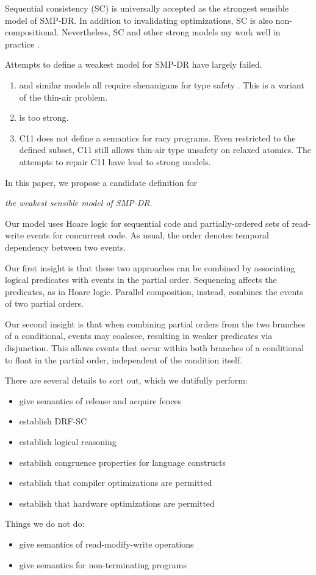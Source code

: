 Sequential consistency (SC) \citep{Lamport:1979:MMC:1311099.1311750} is
universally accepted as the strongest sensible model of SMP-DR.  In addition
to invalidating optimizations, SC is also non-compositional.  Nevertheless,
SC and other strong models my work well in practice
\cite{Singh:2012:ESC:2337159.2337220,Dolan:2018:BDR:3192366.3192421,Ou:2018:TUC:3288538.3276506}.

Attempts to define a weakest model for SMP-DR have largely failed.
\begin{enumerate}
\item \citet{Manson:2005:JMM:1047659.1040336} and similar models
  \cite{DBLP:conf/esop/JagadeesanPR10,DBLP:conf/popl/KangHLVD17} all require
  shenanigans for type safety
  \cite{DBLP:journals/toplas/Lochbihler13,DBLP:conf/tldi/GotoJPR12}.  This is
  a variant of the thin-air problem.
\item \citet{DBLP:conf/lics/JeffreyR16} is too strong.
\item C11 does not define a semantics for racy programs.  Even restricted to
  the defined subset, C11 still allows thin-air type unsafety on relaxed
  atomics. The attempts to repair C11 have lead to strong models.
\end{enumerate}

In this paper, we propose a candidate definition for
\begin{center}
  \emph{the weakest sensible model of SMP-DR}.
\end{center}

Our model uses Hoare logic for sequential code and partially-ordered sets of
read-write events for concurrent code.  As usual, the order denotes temporal
dependency between two events.

Our first insight is that these two approaches can be combined by associating
logical predicates with events in the partial order.  Sequencing affects the
predicates, as in Hoare logic.  Parallel composition, instead, combines the
events of two partial orders.

Our second insight is that when combining partial orders from the two
branches of a conditional, events may coalesce, resulting in weaker
predicates via disjunction.  This allows events that occur within both
branches of a conditional to float in the partial order, independent of the
condition itself.

There are several details to sort out, which we dutifully perform:
\begin{itemize}
\item give semantics of release and acquire fences
\item establish DRF-SC
\item establish logical reasoning
\item establish congruence properties for language constructs
\item establish that compiler optimizations are permitted
\item establish that hardware optimizations are permitted
\end{itemize}

Things we do not do:
\begin{itemize}
\item give semantics of read-modify-write operations
\item give semantics for non-terminating programs
\end{itemize}

